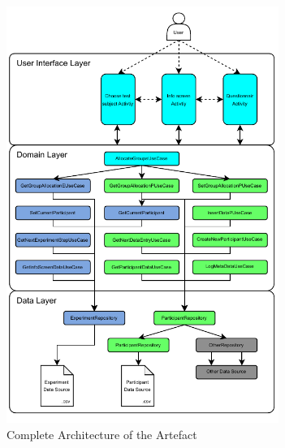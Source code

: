\begin{figure}[htbp]
    \centering
    \includegraphics[width=0.79\textwidth, keepaspectratio]{content/05_design_and_dev_artefacts/Complete Architecture.drawio.pdf}
    \caption{Complete Architecture of the Artefact}    
    \label{fig:completeArchitecture}
\end{figure}